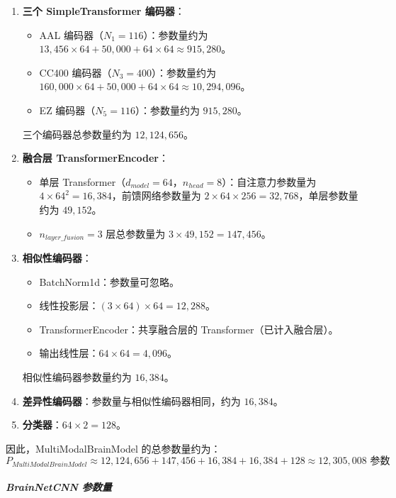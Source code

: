 \documentclass[12pt,a4paper]{article}
\begin{document}
\begin{enumerate}
\item \textbf{三个 SimpleTransformer 编码器}：
  \begin{itemize}
  \item AAL 编码器（$N_1=116$）：参数量约为 $13,456 \times 64 + 50,000 + 64 \times 64 \approx 915,280$。
  \item CC400 编码器（$N_3=400$）：参数量约为 $160,000 \times 64 + 50,000 + 64 \times 64 \approx 10,294,096$。
  \item EZ 编码器（$N_5=116$）：参数量约为 $915,280$。
  \end{itemize}
  三个编码器总参数量约为 $12,124,656$。

\item \textbf{融合层 TransformerEncoder}：
  \begin{itemize}
  \item 单层 Transformer（$d_{model}=64$，$n_{head}=8$）：自注意力参数量为 $4 \times 64^2 = 16,384$，前馈网络参数量为 $2 \times 64 \times 256 = 32,768$，单层参数量约为 $49,152$。
  \item $n_{layer\_fusion}=3$ 层总参数量为 $3 \times 49,152 = 147,456$。
  \end{itemize}

\item \textbf{相似性编码器}：
  \begin{itemize}
  \item BatchNorm1d：参数量可忽略。
  \item 线性投影层：$(3 \times 64) \times 64 = 12,288$。
  \item TransformerEncoder：共享融合层的 Transformer（已计入融合层）。
  \item 输出线性层：$64 \times 64 = 4,096$。
  \end{itemize}
  相似性编码器参数量约为 $16,384$。

\item \textbf{差异性编码器}：参数量与相似性编码器相同，约为 $16,384$。

\item \textbf{分类器}：$64 \times 2 = 128$。
\end{enumerate}

因此，MultiModalBrainModel 的总参数量约为：
\begin{equation}
P_{MultiModalBrainModel} \approx 12,124,656 + 147,456 + 16,384 + 16,384 + 128 \approx 12,305,008 \text{ 参数}
\end{equation}

\subparagraph{BrainNetCNN 参数量}
\end{document}
